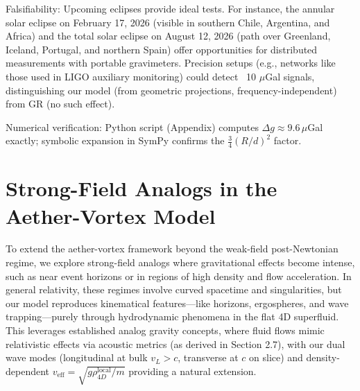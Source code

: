 \documentclass{article}
\begin{document}
Falsifiability: Upcoming eclipses provide ideal tests. For instance, the annular solar eclipse on February 17, 2026 (visible in southern Chile, Argentina, and Africa) and the total solar eclipse on August 12, 2026 (path over Greenland, Iceland, Portugal, and northern Spain) offer opportunities for distributed measurements with portable gravimeters. Precision setups (e.g., networks like those used in LIGO auxiliary monitoring) could detect ~10 $\mu$Gal signals, distinguishing our model (from geometric projections, frequency-independent) from GR (no such effect).

Numerical verification: Python script (Appendix) computes $\Delta g \approx 9.6 \, \mu$Gal exactly; symbolic expansion in SymPy confirms the $\frac{3}{4} (R/d)^2$ factor.

\medskip
\noindent
{}
\medskip


\section{Strong-Field Analogs in the Aether-Vortex Model}

To extend the aether-vortex framework beyond the weak-field post-Newtonian regime, we explore strong-field analogs where gravitational effects become intense, such as near event horizons or in regions of high density and flow acceleration. In general relativity, these regimes involve curved spacetime and singularities, but our model reproduces kinematical features---like horizons, ergospheres, and wave trapping---purely through hydrodynamic phenomena in the flat 4D superfluid. This leverages established analog gravity concepts, where fluid flows mimic relativistic effects via acoustic metrics (as derived in Section 2.7), with our dual wave modes (longitudinal at bulk $v_L > c$, transverse at $c$ on slice) and density-dependent $v_{\text{eff}} = \sqrt{g \rho_{4D}^{\text{local}} / m}$ providing a natural extension.
\end{document}
